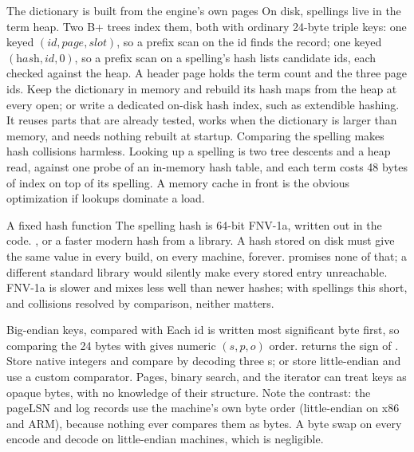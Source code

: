 \begin{decision}{The dictionary is built from the engine's own pages}
 On disk, spellings live in the term heap. Two B+ trees index
them, both with ordinary 24-byte triple keys: one keyed
$(\textit{id}, \textit{page}, \textit{slot})$, so a prefix scan on the id finds
the record; one keyed $(\textit{hash}, \textit{id}, 0)$, so a prefix scan on a
spelling's hash lists candidate ids, each checked against the heap. A header
page holds the term count and the three page ids.
 Keep the dictionary in memory and rebuild its hash maps
from the heap at every open; or write a dedicated on-disk hash index, such as
extendible hashing.
 It reuses parts that are already tested, works when the
dictionary is larger than memory, and needs nothing rebuilt at startup.
Comparing the spelling makes hash collisions harmless.
 Looking up a spelling is two tree descents and a heap read,
against one probe of an in-memory hash table, and each term costs 48 bytes of
index on top of its spelling. A memory cache in front is the obvious
optimization if lookups dominate a load.
\end{decision}

\begin{decision}{A fixed hash function}
 The spelling hash is 64-bit FNV-1a, written out in the code.
 , or a faster modern hash from a library.
 A hash stored on disk must give the same value in every build, on
every machine, forever.  promises none of that; a different
standard library would silently make every stored entry unreachable.
 FNV-1a is slower and mixes less well than newer hashes; with
spellings this short, and collisions resolved by comparison, neither matters.
\end{decision}

\begin{decision}{Big-endian keys, compared with }
 Each id is written most significant byte first, so comparing
the 24 bytes with  gives numeric $(s, p, o)$ order.
 returns the sign of .
 Store native integers and compare by decoding three
s; or store little-endian and use a custom comparator.
 Pages, binary search, and the iterator can treat keys as opaque
bytes, with no knowledge of their structure. Note the contrast: the pageLSN and
log records use the machine's own byte order (little-endian on x86 and ARM),
because nothing ever compares them as bytes.
 A byte swap on every encode and decode on little-endian machines,
which is negligible.
\end{decision}

